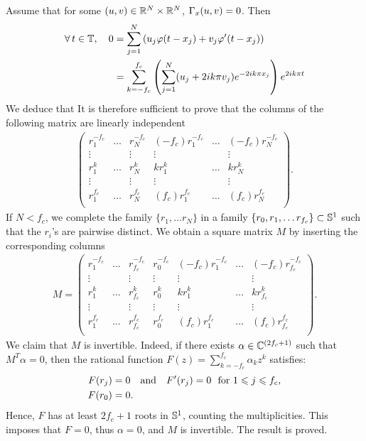 Assume that for some $(u,v)\in \mathbb{R}^N\times \mathbb{R}^N$, $\Gamma_x (u,v)=0$. Then
\begin{align*}
	\forall \,  t\in \mathbb{T}, \quad 0&=\sum_{j=1}^N  \left(u_j\varphi(t-x_j)+v_j \varphi'(t-x_j)\right)\\
&=\sum_{k=-f_c}^{f_c} \left(\sum_{j=1}^N (u_j + 2ik\pi v_j)e^{-2ik\pi x_j}  \right) e^{2ik\pi t}
\end{align*}
We deduce that 
It is therefore sufficient to prove that the columns of the following matrix are linearly independent
\begin{align*}
\begin{pmatrix}
r_1^{-f_c} & \ldots &r_N^{-f_c} & (-f_c)r_1^{-f_c}& \ldots &(-f_c)r_N^{-f_c} \\
\vdots & &\vdots  & \vdots & &\vdots \\
r_1^{k} & \ldots &r_N^{k} & kr_1^{k}& \ldots &k r_N^{k} \\
\vdots & &\vdots  & \vdots & &\vdots \\
r_1^{f_c} & \ldots &r_N^{f_c} & (f_c)r_1^{f_c}& \ldots &(f_c)r_N^{f_c} \\
\end{pmatrix}.
\end{align*}
If $N<f_c$, we complete the family $\{r_1, \ldots r_N\}$ in a family $\{r_0,r_1,\ldots r_{f_c}\}\subset \mathbb{S}^1$ such
 that the $r_i$'s are pairwise distinct. We obtain a square matrix $M$ by inserting the corresponding columns
\begin{align*}
M = \begin{pmatrix}
r_1^{-f_c} & \ldots &r_{f_c}^{-f_c} & r_0^{-f_c} &(-f_c)r_1^{-f_c}& \ldots &(-f_c)r_{f_c}^{-f_c} \\
\vdots & &\vdots  &\vdots & \vdots & &\vdots \\
r_1^{k} & \ldots &r_{f_c}^{k} & r_0^k &kr_1^{k}& \ldots &k r_{f_c}^{k} \\
\vdots & &\vdots &\vdots & \vdots & &\vdots \\
r_1^{f_c} & \ldots &r_{f_c}^{f_c} & r_0^{f_c}&(f_c)r_1^{f_c}& \ldots &(f_c)r_{f_c}^{f_c} \\
\end{pmatrix}.
\end{align*}
 We claim that $M$ is invertible. Indeed, if there exists $\alpha\in \mathbb{C}^{(2f_c+1)}$ such that
  $M^T \alpha=0$, then the rational function $F(z) = \sum_{k=-f_c}^{f_c} \alpha_k z^{k}$ satisfies:
\begin{align*}
  	F(r_j)&=0 \quad \text{and} \quad F'(r_j)=0 \ \mbox{ for } 1\leqslant j \leqslant f_c,\\
  	F(r_0)&=0.
\end{align*}
Hence, $F$ has at least $2f_c+1$ roots in $\mathbb{S}^1$, counting the multiplicities. This imposes that $F=0$, thus $\alpha=0$,
 and $M$ is invertible. The result is proved.

